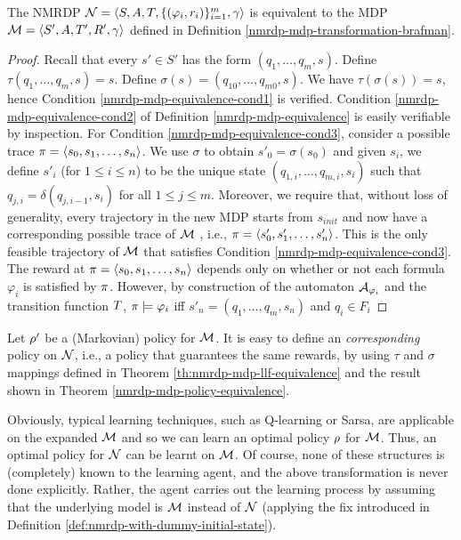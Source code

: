 \begin{theorem}\label{th:nmrdp-mdp-llf-equivalence}
	The NMRDP $\mathcal{N}= \langle S, A, T, \{(\varphi_i,r_i)\}_{i=1}^{m}, \gamma \rangle$ is equivalent to the  MDP $\mathcal{M}= \langle S',A,T',R', \gamma \rangle$ defined in Definition \ref{nmrdp-mdp-transformation-brafman}.
\end{theorem}
\begin{proof}
	Recall that every $s' \in S'$ has the form $(q_1 ,\dots, q_m , s)$.
	Define $\tau(q_1 ,\dots, q_m, s) = s$. Define $\sigma(s) = (q_{10} ,\dots, q_{m0}, s)$.
	We have $\tau(\sigma(s)) = s$, hence Condition \ref{nmrdp-mdp-equivalence-cond1} is verified. Condition \ref{nmrdp-mdp-equivalence-cond2} of Definition \ref{nmrdp-mdp-equivalence} is easily verifiable by inspection. For Condition \ref{nmrdp-mdp-equivalence-cond3}, consider a possible trace
	$\pi = \langle s_0, s_1, \dots, s_n \rangle$. We use $\sigma$ to obtain $s'_0 = \sigma(s_0)$
	and given $s_i$, we define $s'_i$ (for $1 \le i \le n$) to be the unique
	state $(q_{1,i} ,\dots, q_{m,i} , s_i)$ such that $q_{j,i} = \delta(q_{j,i-1}, s_i )$ for all
	$1 \le j \le m$. Moreover, we require that, without loss of generality, every trajectory in the new MDP starts from $s_{init}$ and  now have a corresponding possible trace of
	$\mathcal{M}$ , i.e., $\pi = \langle s'_0, s'_1, \dots, s'_n \rangle$. This is the only feasible trajectory of $\mathcal{M}$ that satisfies Condition \ref{nmrdp-mdp-equivalence-cond3}. The reward at
	$\pi = \langle s_0, s_1, \dots, s_n \rangle$ depends only on whether or not
	each formula $\varphi_i$ is satisfied by $\pi$. However, by construction
	of the automaton $\mathcal{A}_{\varphi_i}$ and the transition function $T$, $\pi \models \varphi_i$
	iff $s'_{n} = (q_1 ,\dots, q_m, s_n)$ and $q_i \in F_i$
\end{proof}


Let $\rho'$ be a (Markovian) policy for $\mathcal{M}$. It is easy to define an \emph{corresponding} policy on $\mathcal{N}$, i.e., a policy that guarantees the same rewards, by using $\tau$ and $\sigma$ mappings defined in Theorem \ref{th:nmrdp-mdp-llf-equivalence} and the result shown in Theorem \ref{nmrdp-mdp-policy-equivalence}.

Obviously, typical learning techniques, such as Q-learning
or Sarsa,  are applicable on the expanded
$\mathcal{M}$ and
so we can learn an optimal policy $\rho$ for $\mathcal{M}$. 
Thus, an optimal policy for $\mathcal{N}$ can be learnt on $\mathcal{M}$. 
Of course, none of these structures is (completely) 
known to the learning agent, and the above transformation is 
never done explicitly. Rather, the agent carries out the learning process
by assuming that the underlying model is $\mathcal{M}$ instead of $\mathcal{N}$ (applying the fix introduced in Definition \ref{def:nmrdp-with-dummy-initial-state}).


